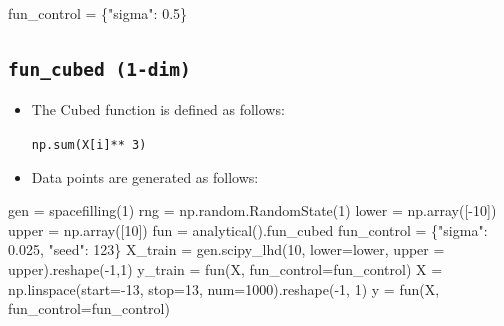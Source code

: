 \documentclass[
  letterpaper,
  DIV=11,
  numbers=noendperiod]{scrreprt}
\newenvironment{Shaded}{\begin{snugshade}}{\end{snugshade}}
\newcommand{\DecValTok}[1]{\textcolor[rgb]{0.68,0.00,0.00}{#1}}
\newcommand{\FloatTok}[1]{\textcolor[rgb]{0.68,0.00,0.00}{#1}}
\newcommand{\NormalTok}[1]{\textcolor[rgb]{0.00,0.23,0.31}{#1}}
\newcommand{\OperatorTok}[1]{\textcolor[rgb]{0.37,0.37,0.37}{#1}}
\newcommand{\StringTok}[1]{\textcolor[rgb]{0.13,0.47,0.30}{#1}}
\begin{document}
\begin{Shaded}
\begin{Highlighting}[]
\NormalTok{fun\_control }\OperatorTok{=}\NormalTok{ \{}\StringTok{"sigma"}\NormalTok{: }\FloatTok{0.5}\NormalTok{\}}
\end{Highlighting}
\end{Shaded}

\hypertarget{fun_cubed-1-dim}{%
\subsection{\texorpdfstring{\texttt{fun\_cubed\ (1-dim)}}{fun\_cubed (1-dim)}}\label{fun_cubed-1-dim}}

\begin{itemize}
\item
  The Cubed function is defined as follows:

  \texttt{np.sum(X{[}i{]}**\ 3)}
\item
  Data points are generated as follows:
\end{itemize}

\begin{Shaded}
\begin{Highlighting}[]
\NormalTok{gen }\OperatorTok{=}\NormalTok{ spacefilling(}\DecValTok{1}\NormalTok{)}
\NormalTok{rng }\OperatorTok{=}\NormalTok{ np.random.RandomState(}\DecValTok{1}\NormalTok{)}
\NormalTok{lower }\OperatorTok{=}\NormalTok{ np.array([}\OperatorTok{{-}}\DecValTok{10}\NormalTok{])}
\NormalTok{upper }\OperatorTok{=}\NormalTok{ np.array([}\DecValTok{10}\NormalTok{])}
\NormalTok{fun }\OperatorTok{=}\NormalTok{ analytical().fun\_cubed}
\NormalTok{fun\_control }\OperatorTok{=}\NormalTok{ \{}\StringTok{"sigma"}\NormalTok{: }\FloatTok{0.025}\NormalTok{,}
               \StringTok{"seed"}\NormalTok{: }\DecValTok{123}\NormalTok{\}}
\NormalTok{X\_train }\OperatorTok{=}\NormalTok{ gen.scipy\_lhd(}\DecValTok{10}\NormalTok{, lower}\OperatorTok{=}\NormalTok{lower, upper }\OperatorTok{=}\NormalTok{ upper).reshape(}\OperatorTok{{-}}\DecValTok{1}\NormalTok{,}\DecValTok{1}\NormalTok{)}
\NormalTok{y\_train }\OperatorTok{=}\NormalTok{ fun(X, fun\_control}\OperatorTok{=}\NormalTok{fun\_control)}
\NormalTok{X }\OperatorTok{=}\NormalTok{ np.linspace(start}\OperatorTok{={-}}\DecValTok{13}\NormalTok{, stop}\OperatorTok{=}\DecValTok{13}\NormalTok{, num}\OperatorTok{=}\DecValTok{1000}\NormalTok{).reshape(}\OperatorTok{{-}}\DecValTok{1}\NormalTok{, }\DecValTok{1}\NormalTok{)}
\NormalTok{y }\OperatorTok{=}\NormalTok{ fun(X, fun\_control}\OperatorTok{=}\NormalTok{fun\_control)}
\end{Highlighting}
\end{Shaded}
\end{document}
